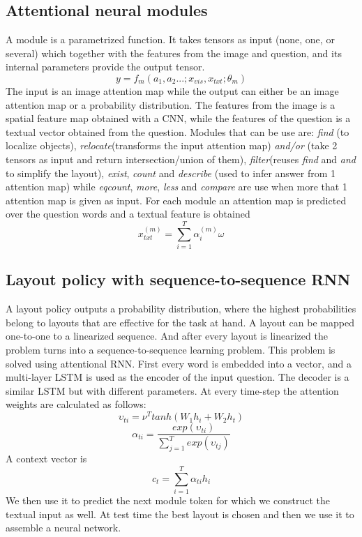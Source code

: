 \documentclass{article}
\begin{document}
	\subsection{Attentional neural modules}
	A module is a parametrized function. It takes tensors as input (none, one, or several) which together with the features from the image and question, and its internal parameters provide the output tensor.
	\begin{equation}
			y = f_{m}(a_{1},a_{2}...;x_{vis},x_{txt};\theta _{m})
	\end{equation}
	The input is an image attention map while the output can either be an image attention map or a probability distribution. The features from the image is a spatial feature map obtained with a CNN, while the features of the question is a textual vector obtained from the question. Modules that can be use are: \textit{find} (to localize objects), \textit{relocate}(transforms the input attention map) \textit{and/or} (take 2 tensors as input and return intersection/union of them), \textit{filter}(reuses \textit{find} and \textit{and} to simplify the layout), \textit{exist}, \textit{count} and  \textit{describe} (used to infer answer from 1 attention map) while \textit{eqcount}, \textit{more}, \textit{less} and \textit{compare} are use when more that 1 attention map is given as input.
	For each module an attention map is predicted over the question words and a textual feature is obtained
	\begin{equation}
		x_{txt}^{(m)} = \sum_{i=1}^{T}\alpha _{i}^{(m)}\omega _{}
	\end{equation}
	\subsection{Layout policy with sequence-to-sequence RNN}
	A layout policy outputs a probability distribution, where the highest probabilities belong to layouts that are effective for the task at hand. A layout can be mapped one-to-one to a linearized sequence. And after every layout is linearized the problem turns into a sequence-to-sequence learning problem. This problem is solved using attentional RNN. First every word is embedded into a vector, and a multi-layer LSTM is used as the encoder of the input question. The decoder is a similar LSTM but with different parameters. At every time-step the attention weights are calculated as follows:
	\begin{equation}
		\upsilon _{ti} = \nu ^{T} tanh(W_{1}h_{i} + W_{2}h_{t})
	\end{equation}
	\begin{equation}
		\alpha _{ti} = \frac{exp(\upsilon _{ti})}{\sum_{j=1}^{T}exp(\upsilon _{tj})}
	\end{equation}
	A context vector is 
	\begin{equation}
		c_{t} = \sum_{i=1}^{T}\alpha _{ti}h_{i}
	\end{equation}
	We then use it to predict the next module token for which we construct the textual input as well. At test time the best layout is chosen and then we use it to assemble a neural network.
\end{document}
